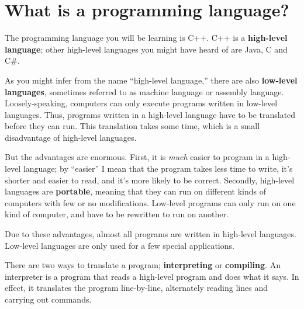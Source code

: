 \begin{comment}
Of course, the other goal of this book is to prepare you for the
Computer Science AP Exam.  We may not take the most direct approach
to that goal, though.  For example, there are not many exercises in
this book that are similar to the AP questions.  On the other hand,
if you understand the concepts in this book, along with the details
of programming in C++, you will have all the tools you need to
do well on the exam.
\end{comment}

\section{What is a programming language?}

The programming language you will be learning is C++.  C++ is a {\bf high-level language}; other high-level languages you might have heard of are Java, C and C\#.

As you might infer from the name ``high-level language,'' there are
also {\bf low-level languages}, sometimes referred to as machine
language or assembly language.  Loosely-speaking, computers can only
execute programs written in low-level languages.  Thus, programs
written in a high-level language have to be translated before they can
run.  This translation takes some time, which is a small disadvantage
of high-level languages.


But the advantages are enormous.  First,
it is {\em much} easier to program in a high-level language;
by ``easier'' I mean that the program takes less time to write,
it's shorter and easier to read, and it's more likely to be
correct.  Secondly, high-level languages are {\bf portable},
meaning that they can run on different kinds of computers with
few or no modifications.  Low-level programs can only run
on one kind of computer, and have to be rewritten to run on
another.

Due to these advantages, almost all programs are written in
high-level languages.  Low-level languages are only used for
a few special applications.


There are two ways to translate a program; {\bf interpreting} or {\bf
compiling}.  An interpreter is a program that reads a high-level
program and does what it says.  In effect, it translates the program
line-by-line, alternately reading lines and carrying out commands.

